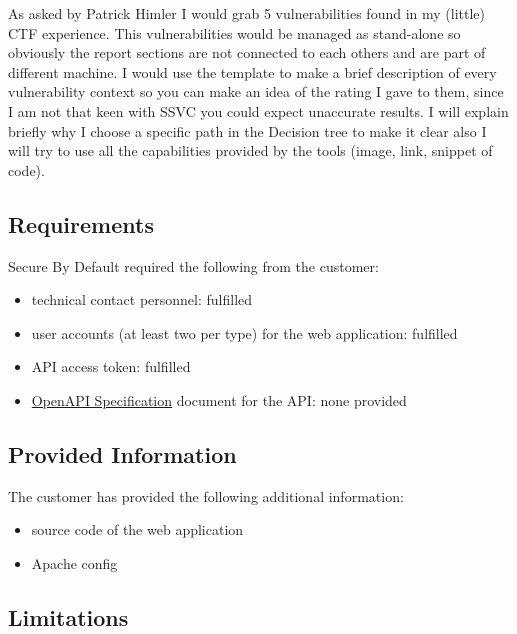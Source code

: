\documentclass[a4paper]{article}
\begin{document}
As asked by Patrick Himler I would grab 5 vulnerabilities found in my (little) CTF experience. This
vulnerabilities would be managed as stand-alone so obviously the report sections are not connected to
each others and are part of different machine. I would use the template to make a brief description of every vulnerability context so you can make an idea of the rating I gave to them, since I am not that keen with SSVC you could expect unaccurate results. I will explain briefly why I choose a specific path in the Decision tree to make it clear also I will try to use all the capabilities provided by the tools (image, link, snippet of code).

  \subsection{Requirements}

  Secure By Default required the following from the customer:

  \begin{itemize}
          \item technical contact personnel: fulfilled

          \item user accounts (at least two per type) for the web application: fulfilled

          \item API access token: fulfilled

          \item \href{https://www.openapis.org/}{OpenAPI Specification} document for the API: none provided

      \end{itemize}

  \subsection{Provided Information}

  The customer has provided the following additional information:

  \begin{itemize}
          \item source code of the web application

          \item Apache config

      \end{itemize}

  \subsection{Limitations}
\end{document}
